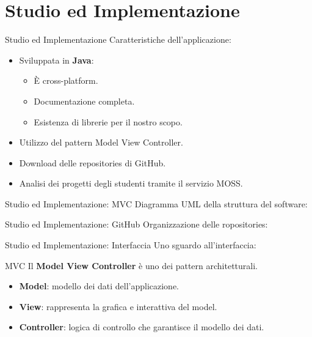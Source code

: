 \documentclass{beamer}
\begin{document}
	\section{Studio ed Implementazione}
	
	\begin{frame}{Studio ed Implementazione}
		Caratteristiche dell'applicazione:
		\begin{itemize}[<+->]
			\item Sviluppata in \textbf{Java}:
				\begin{itemize}[<+->]
					\item \`E cross-platform.
					\item Documentazione completa.
					\item Esistenza di librerie per il nostro scopo.
				\end{itemize}
			\item Utilizzo del pattern Model View Controller.
			\item Download delle repositories di GitHub.
			\item Analisi dei progetti degli studenti tramite il servizio MOSS.
		\end{itemize}
	\end{frame}
	
	\begin{frame}{Studio ed Implementazione: MVC}
		Diagramma UML della struttura del software:
		\begin{center}
		\end{center}
	\end{frame}
	
	\begin{frame}{Studio ed Implementazione: GitHub}
		Organizzazione delle ropositories:
		\begin{center}
		\end{center}
	\end{frame}
	
	\begin{frame}{Studio ed Implementazione: Interfaccia}
		Uno sguardo all'interfaccia:
		\begin{center}
		\end{center}
	\end{frame}

	\begin{frame}{MVC}
		Il \textbf{Model View Controller} è uno dei pattern architetturali.
		\begin{itemize}
			\item \textbf{Model}: modello dei dati dell'applicazione.
			\item \textbf{View}: rappresenta la grafica e interattiva del model.
			\item \textbf{Controller}: logica di controllo che garantisce il modello dei dati.
		\end{itemize}
		\begin{center}
		\end{center}
	\end{frame}
	
\end{document}
